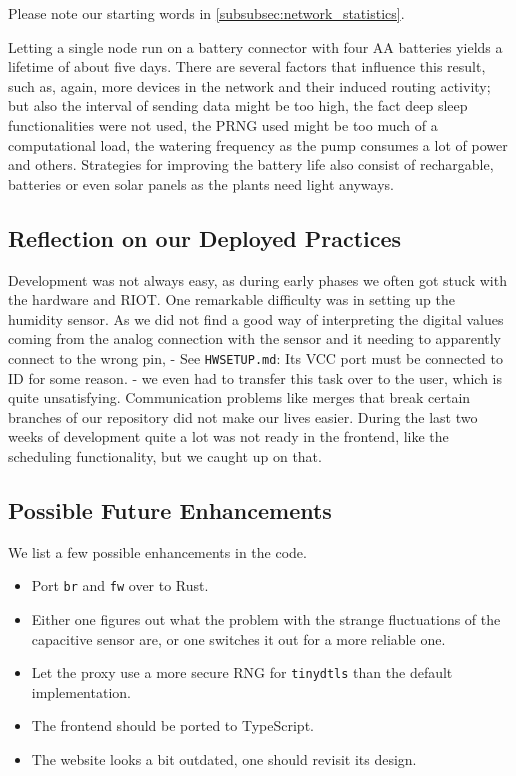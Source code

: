 \documentclass[acmtog, language=english, nonacm]{acmart}
\begin{document}
    Please note our starting words in \cref{subsubsec:network_statistics}.

    Letting a single node run on a battery connector with four AA batteries yields a lifetime of about five days. There are several factors that influence this result, such as, again, more devices in the network and their induced routing activity; but also the interval of sending data might be too high, the fact deep sleep functionalities were not used, the PRNG used might be too much of a computational load, the watering frequency as the pump consumes a lot of power and others. Strategies for improving the battery life also consist of rechargable, batteries or even solar panels as the plants need light anyways.

    \subsection{Reflection on our Deployed Practices}

    Development was not always easy, as during early phases we often got stuck with the hardware and RIOT. One remarkable difficulty was in setting up the humidity sensor. As we did not find a good way of interpreting the digital values coming from the analog connection with the sensor and it needing to apparently connect to the wrong pin, - See \texttt{HWSETUP.md}: Its VCC port must be connected to ID for some reason. - we even had to transfer this task over to the user, which is quite unsatisfying. Communication problems like merges that break certain branches of our repository did not make our lives easier. During the last two weeks of development quite a lot was not ready in the frontend, like the scheduling functionality, but we caught up on that.

    \subsection{Possible Future Enhancements}

    We list a few possible enhancements in the code.
    \begin{itemize}
        \item Port \texttt{br} and \texttt{fw} over to Rust.
        \item Either one figures out what the problem with the strange fluctuations of the capacitive sensor are, or one switches it out for a more reliable one.
        \item Let the proxy use a more secure RNG for \texttt{tinydtls} than the default implementation.
        \item The frontend should be ported to TypeScript.
        \item The website looks a bit outdated, one should revisit its design.
    \end{itemize}
\end{document}
